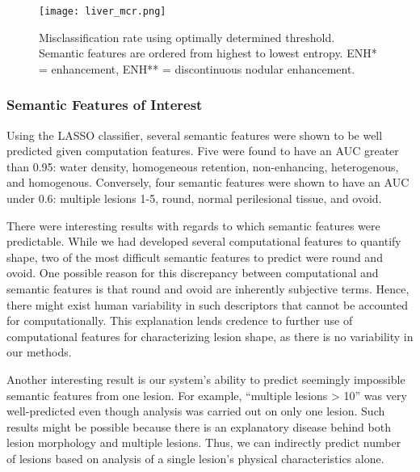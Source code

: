 \begin{figure}
	\centering
	\texttt{[image: liver\_mcr.png]}
	\caption[MCR results for liver annotation]{Misclassification rate using optimally determined threshold. Semantic features are ordered from highest to lowest entropy. ENH* = enhancement, ENH** = discontinuous nodular enhancement.}
	\label{fig:liver_mcr}
\end{figure}


\clearpage


\subsubsection{Semantic Features of Interest}
Using the LASSO classifier, several semantic features were shown to be well predicted given computation features. Five were found to have an AUC greater than 0.95: water density, homogeneous retention, non-enhancing, heterogenous, and homogenous.
Conversely, four semantic features were shown to have an AUC under 0.6: multiple lesions 1-5, round, normal perilesional tissue, and ovoid.

There were interesting results with regards to which semantic features were predictable. While we had developed several computational features to quantify shape, two of the most difficult semantic features to predict were round and ovoid. One possible reason for this discrepancy between computational and semantic features is that round and ovoid are inherently subjective terms. Hence, there might exist human variability in such descriptors that cannot be accounted for computationally. This explanation lends credence to further use of computational features for characterizing lesion shape, as there is no variability in our methods.

Another interesting result is our system's ability to predict seemingly impossible semantic features from one lesion. For example, ``multiple lesions > 10'' was very well-predicted even though analysis was carried out on only one lesion. Such results might be possible because there is an explanatory disease behind both lesion morphology and multiple lesions. Thus, we can indirectly predict number of lesions based on analysis of a single lesion's physical characteristics alone.


